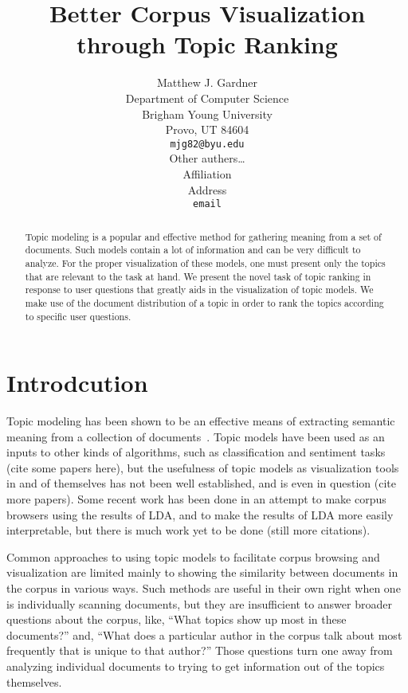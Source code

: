 \documentclass{article}
\title{Better Corpus Visualization through Topic Ranking}
\author{
Matthew J. Gardner \\
Department of Computer Science \\
Brigham Young University \\
Provo, UT 84604 \\
\texttt{mjg82@byu.edu} \\
\And
Other authers\ldots \\
Affiliation \\
Address \\
\texttt{email} \\
}
\begin{document}
\maketitle

\begin{abstract}

Topic modeling is a popular and effective method for gathering meaning from a
set of documents.  Such models contain a lot of information and can be very
difficult to analyze.  For the proper visualization of these models, one must
present only the topics that are relevant to the task at hand.  We present the
novel task of topic ranking in response to user questions that greatly aids in
the visualization of topic models.  We make use of the document distribution of
a topic in order to rank the topics according to specific user questions.

\end{abstract}

\section{Introdcution}
\label{sec:introduction}

Topic modeling has been shown to be an effective means of extracting semantic
meaning from a collection of
documents~\cite{blei-2003-latent-dirichlet-allocation}.  Topic models have been
used as an inputs to other kinds of algorithms, such as classification and
sentiment tasks (cite some papers here), but the usefulness of topic models as
visualization tools in and of themselves has not been well established, and is
even in question (cite more papers).  Some recent work has been done in an
attempt to make corpus browsers using the results of LDA, and to make the
results of LDA more easily interpretable, but there is much work yet to be done
(still more citations).  

Common approaches to using topic models to facilitate corpus browsing and
visualization are limited mainly to showing the similarity between documents in
the corpus in various ways.  Such methods are useful in their own right when
one is individually scanning documents, but they are insufficient to answer
broader questions about the corpus, like, ``What topics show up most in these
documents?'' and, ``What does a particular author in the corpus talk about most
frequently that is unique to that author?''  Those questions turn one away from
analyzing individual documents to trying to get information out of the topics
themselves.
\end{document}
